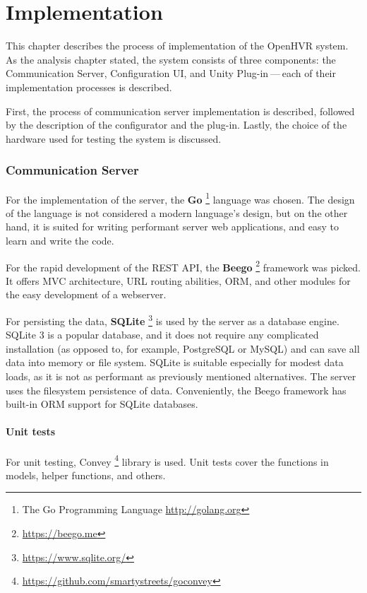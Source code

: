 \chapter{Implementation}

This chapter describes the process of implementation of the OpenHVR system.
As the analysis chapter stated, the system consists of three components: the
Communication Server, Configuration UI, and Unity Plug-in — each of their
implementation processes is described.


First, the process of communication server implementation is described,
followed by the description of the configurator and the plug-in. Lastly, the choice
of the hardware used for testing the system is discussed.


\hypertarget{x-communication-server}{\subsection*{Communication Server}}
For the implementation of the server, the
\textbf{Go} \footnote{The Go Programming Language \href{http://golang.org}{http://golang.org}} language was
chosen. The design of the language is not considered a modern
language’s design, but on the other hand, it is
suited for writing performant server web applications, and easy
to learn and write the code. \hyperlink{gogbu}{}


For the rapid development of the REST API, the \textbf{Beego} \footnote{\href{https://beego.me}{https://beego.me}}
framework was picked. It offers MVC architecture, URL routing abilities, ORM,
and other modules for the easy development of a webserver. \hyperlink{beego}{}


For persisting the data, \textbf{SQLite} \footnote{\href{https://www.sqlite.org/}{https://www.sqlite.org/}}
is used by the server as a database engine. SQLite 3 is
a popular database, and it does not require any complicated installation
(as opposed to, for example, PostgreSQL or MySQL) and can save all data into
memory or file system. SQLite is suitable especially for modest data loads, as
it is not as performant as previously mentioned alternatives. The server uses the
filesystem persistence of data. Conveniently, the Beego framework has built-in
ORM support for SQLite databases.


\hypertarget{x-unit-tests}{\subsubsection*{Unit tests}}
For unit testing, Convey \footnote{\href{https://github.com/smartystreets/goconvey}{https://github.com/smartystreets/goconvey}}
library is used. Unit tests cover the functions in models, helper functions,
and others.


